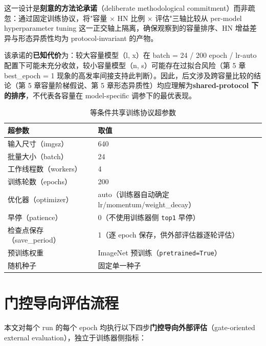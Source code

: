 \documentclass[UTF8,openany,12pt]{ctexbook}
\newcommand{\formalmetric}[1]{\texttt{#1}}
\begin{document}
这一设计是\textbf{刻意的方法论承诺}（deliberate methodological commitment）而非疏忽：通过固定训练协议，将"容量 $\times$ HN 比例 $\times$ 评估"三轴比较从 per-model hyperparameter tuning 这一正交轴上隔离，确保观察到的容量排序、HN 增益差异与形态异质性均为 protocol-invariant 的产物。

该承诺的\textbf{已知代价}为：较大容量模型（l, x）在 batch = 24 / 200 epoch / lr-auto 配置下可能未充分收敛，较小容量模型（n, s）可能存在过拟合风险（第 5 章 best\_epoch = 1 现象的高发率间接支持此判断）。因此，后文涉及跨容量比较的结论（第 5 章容量阶梯假说、第 5 章形态异质性）均应理解为\textbf{shared-protocol 下的排序}，不代表各容量在 model-specific 调参下的最优表现。

\begin{table}[H]
    \centering
    \caption{等条件共享训练协议超参数}
    \label{tab:stage1-env-protocol}
    \begin{tabularx}{\textwidth}{p{3.8cm}X}
        \toprule
        超参数 & 取值 \\
        \midrule
        输入尺寸（imgsz） & 640 \\
        批量大小（batch） & 24 \\
        工作线程数（workers） & 4 \\
        训练轮数（epochs） & 200 \\
        优化器（optimizer） & auto（训练器自动确定 lr/momentum/weight\_decay） \\
        早停（patience） & 0（不使用训练器侧 \formalmetric{top1} 早停） \\
        检查点保存（save\_period） & 1（逐 epoch 保存，供外部评估器逐轮评估） \\
        预训练权重 & ImageNet 预训练（\texttt{pretrained=True}） \\
        随机种子 & 固定单一种子 \\
        \bottomrule
    \end{tabularx}
\end{table}

\section{门控导向评估流程}
\label{sec:eval-pipeline}

本文对每个 run 的每个 epoch 均执行以下四步\textbf{门控导向外部评估}（gate-oriented external evaluation），独立于训练器侧指标：
\end{document}
